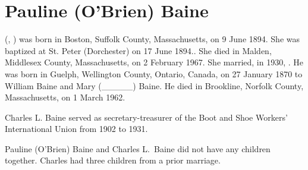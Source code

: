 \section{Pauline (O'Brien) Baine}

 (, ) was born in Boston, Suffolk County, Massachusetts, on 9 June 1894.\cite{Pauline4OBrienBirth} She was baptized at St. Peter (Dorchester) on 17 June 1894.\cite{Pauline4OBrienBaptism}. She died in Malden, Middlesex County, Massachusetts, on 2 February 1967.\cite{Pauline4OBrienDeath} She married, in 1930, .\cite{CharlesBaineMarriage} He was born in Guelph, Wellington County, Ontario, Canada, on 27 January 1870\cite{CharlesBainePassport} to William Baine and Mary (\_\_\_\_\_) Baine.\cite{Census1880CharlesBaine} He died in Brookline, Norfolk County, Massachusetts, on 1 March 1962.\cite{CharlesBaineDeath}

Charles L. Baine served as secretary-treasurer of the Boot and Shoe Workers' International Union from 1902 to 1931.\cite{Gompers}

Pauline (O'Brien) Baine and Charles L.\ Baine did not have any children together.\cite{Pauline4OBrienDeath2} Charles had three children from a prior marriage.\cite{CharlesBaineDeath}